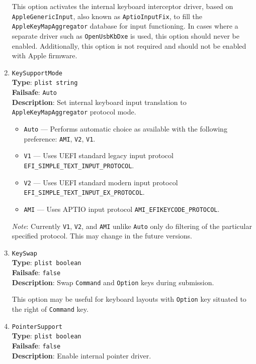 \documentclass[]{article}
\providecommand{\tightlist}{%
  \setlength{\itemsep}{0pt}\setlength{\parskip}{0pt}}
\begin{document}
\begin{enumerate}
  This option activates the internal keyboard interceptor driver, based on
  \texttt{AppleGenericInput}, also known as \texttt{AptioInputFix}, to fill
  the \texttt{AppleKeyMapAggregator} database for input functioning. In cases
  where a separate driver such as \texttt{OpenUsbKbDxe} is used, this option
  should never be enabled. Additionally, this option is not required and
  should not be enabled with Apple firmware.

\item
  \texttt{KeySupportMode}\\
  \textbf{Type}: \texttt{plist\ string}\\
  \textbf{Failsafe}: \texttt{Auto}\\
  \textbf{Description}: Set internal keyboard input translation to
  \texttt{AppleKeyMapAggregator} protocol mode.

  \begin{itemize}
  \tightlist
  \item \texttt{Auto} --- Performs automatic choice as available with the following preference: \texttt{AMI}, \texttt{V2}, \texttt{V1}.
  \item \texttt{V1} --- Uses UEFI standard legacy input protocol \texttt{EFI\_SIMPLE\_TEXT\_INPUT\_PROTOCOL}.
  \item \texttt{V2} --- Uses UEFI standard modern input protocol \texttt{EFI\_SIMPLE\_TEXT\_INPUT\_EX\_PROTOCOL}.
  \item \texttt{AMI} --- Uses APTIO input protocol \texttt{AMI\_EFIKEYCODE\_PROTOCOL}.
  \end{itemize}

  \emph{Note}: Currently \texttt{V1}, \texttt{V2}, and \texttt{AMI} unlike \texttt{Auto} only do filtering of
  the particular specified protocol. This may change in the future versions.

\item
  \texttt{KeySwap}\\
  \textbf{Type}: \texttt{plist\ boolean}\\
  \textbf{Failsafe}: \texttt{false}\\
  \textbf{Description}: Swap \texttt{Command} and \texttt{Option} keys during submission.

  This option may be useful for keyboard layouts with \texttt{Option} key situated to the right
  of \texttt{Command} key.

\item
  \texttt{PointerSupport}\\
  \textbf{Type}: \texttt{plist\ boolean}\\
  \textbf{Failsafe}: \texttt{false}\\
  \textbf{Description}: Enable internal pointer driver.


\end{enumerate}
\end{document}
